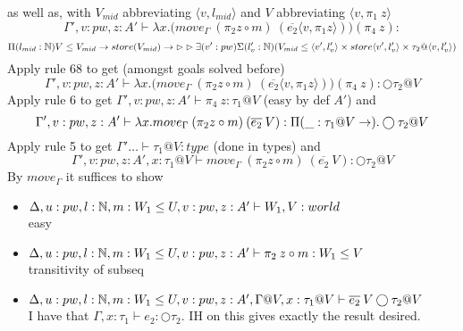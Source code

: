 \documentclass{article}
\begin{document}
\begin{itemize}
\begin{itemize}
\begin{itemize}
    as well as, with $V_{mid}$ abbreviating $\langle v, l_{mid} \rangle$ and $V$ abbreviating $\langle v, \pi_1 \: z \rangle$
    \[\Gamma', v: pw, z:A'  \vdash \lambda x. \big(move_{\Gamma} \: (\pi_2 z \circ m) \: (\overline{e_2}\langle v,  \pi_1 z \rangle) \big) (\pi_4 \: z) :\] 
    \[\Pi(l_{mid} : \mathbb{N}) V \leq V_{mid} \rightarrow store(V_{mid}) \rightarrow \rhd \rhd 
    \exists(v': pw)\Sigma(l_v' : \mathbb{N})(V_{mid} \leq \langle v', l_v' \rangle \times store\langle v', l_v' \rangle \times \tau_2 @ \langle v, l_v' \rangle)\]
    Apply rule 68 to get (amongst goals solved before)
        \[\Gamma', v: pw, z:A'  \vdash \lambda x. \big(move_{\Gamma} \: (\pi_2 z \circ m) \: (\overline{e_2}\langle v,  \pi_1 z \rangle) \big) (\pi_4 \: z) : \bigcirc \tau_2 @ V\] 
    Apply rule 6 to get  $\Gamma', v: pw, z:A'  \vdash \pi_4 \: z : \tau_1 @ V$ (easy by def $A'$) and
    \[\Gamma', v: pw, z:A' \vdash \lambda x. move_{\Gamma} \: (\pi_2 z \circ m) \: (\overline{e_2} \:V) :
    \Pi(\_ : \tau_1 @ V \rightarrow ).\bigcirc \tau_2 @ V
    \] 
    Apply rule 5 to get $\Gamma' \dots \vdash  \tau_1 @ V : type$ (done in types) and 
    \[\Gamma', v: pw, z:A', x: \tau_1 @ V \vdash move_{\Gamma} \: (\pi_2 z \circ m) \: (\overline{e_2} \:V) : \bigcirc \tau_2 @ V\]
    By $move_{\Gamma}$ it suffices to show
    \begin{itemize}
        \item $\Delta, u: pw, l: \mathbb{N}, m: W_1 \leq U, v: pw, z:A' \vdash W_1, V: world$\\
        easy
        \item $\Delta, u: pw, l: \mathbb{N}, m: W_1 \leq U, v: pw, z:A' \vdash \pi_2 \: z \circ m : W_1 \leq V$\\
        transitivity of subseq
        \item $\Delta, u: pw, l: \mathbb{N}, m: W_1 \leq U, v: pw, z:A', \Gamma @ V, x: \tau_1 @V \vdash \overline{e_2} \:V\bigcirc \tau_2 @ V$\\
        I have that $\Gamma, x: \tau_1 \vdash e_2 : \bigcirc \tau_2$. IH on this gives exactly the result desired.
    \end{itemize}
    

\end{itemize}
\end{itemize}
\end{itemize}
\end{document}
